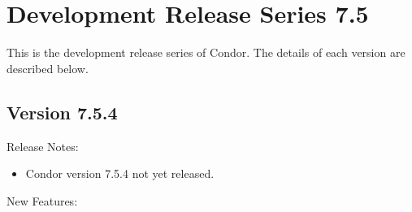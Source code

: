 
\section{\label{sec:History-7-5}Development Release Series 7.5}

This is the development release series of Condor.
The details of each version are described below.


\subsection*{\label{sec:New-7-5-4}Version 7.5.4}

\noindent Release Notes:

\begin{itemize}

\item Condor version 7.5.4 not yet released.

\end{itemize}


\noindent New Features:

